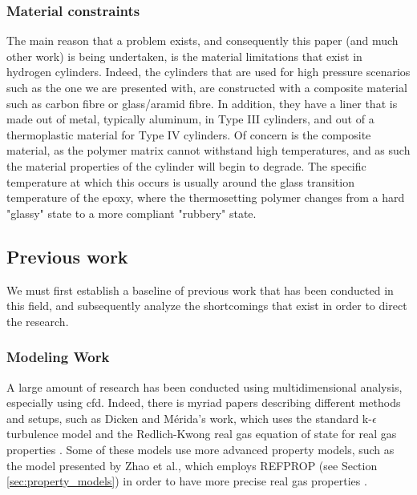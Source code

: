 \subsubsection{Material constraints}
\label{sec:materialConstraints}
The main reason that a problem exists, and consequently this paper (and much other work) is being undertaken, is the material limitations that exist in hydrogen cylinders. Indeed, the cylinders that are used for high pressure scenarios such as the one we are presented with, are constructed with a composite material such as carbon fibre or glass/aramid fibre. In addition, they have a liner that is made out of metal, typically aluminum, in Type III cylinders, and out of a thermoplastic material for Type IV cylinders. Of concern is the composite material, as the polymer matrix cannot withstand high temperatures, and as such the material properties of the cylinder will begin to degrade. The specific temperature at which this occurs is usually around the glass transition temperature of the epoxy, where the thermosetting polymer changes from a hard "glassy" state to a more compliant "rubbery" state.  

\subsection{Previous work}

We must first establish a baseline of previous work that has been conducted in this field, and subsequently analyze the shortcomings that exist in order to direct the research.

\subsubsection{Modeling Work}
A large amount of research has been conducted using multidimensional analysis, especially using \gls{cfd}. Indeed, there is myriad papers describing different methods and setups, such as Dicken and M\'erida's work, which uses the standard  k-$\epsilon$ turbulence model  and the Redlich-Kwong real gas equation of state for real gas properties \cite{Dicken2007a}. 
Some of these models use more advanced property models, such as the model presented by Zhao et al., which employs REFPROP (see Section \ref{sec:property_models}) in order to have more precise real gas properties \cite{Zhao2012}.

